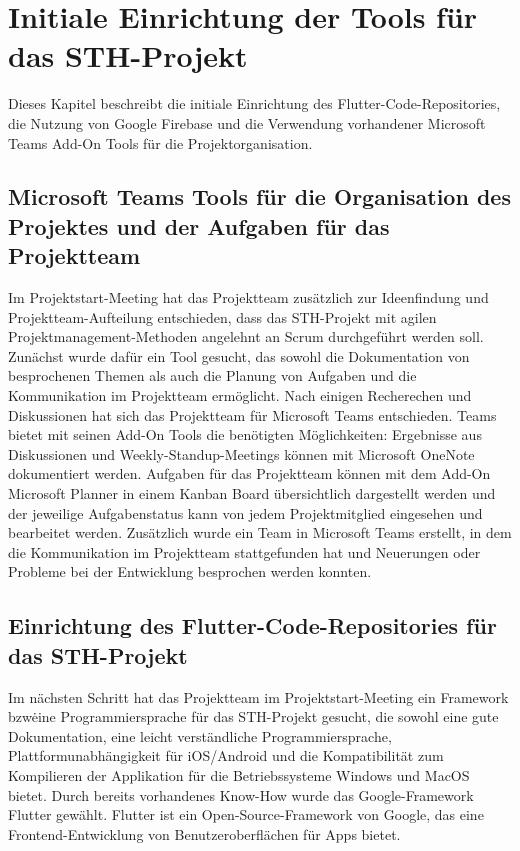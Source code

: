 \chapter{Initiale Einrichtung der Tools für das STH-Projekt}
Dieses Kapitel beschreibt die initiale Einrichtung des Flutter-Code-Repositories, die Nutzung von Google Firebase und die Verwendung vorhandener Microsoft Teams Add-On Tools für die Projektorganisation.

\section*{Microsoft Teams Tools für die Organisation des Projektes und der Aufgaben für das Projektteam}
Im Projektstart-Meeting hat das Projektteam zusätzlich zur Ideenfindung und Projektteam-Aufteilung entschieden, dass das STH-Projekt mit agilen Projektmanagement-Methoden angelehnt an Scrum durchgeführt werden soll.
Zunächst wurde dafür ein Tool gesucht, das sowohl die Dokumentation von besprochenen Themen als auch die Planung von Aufgaben und die Kommunikation im Projektteam ermöglicht.
Nach einigen Recherechen und Diskussionen hat sich das Projektteam für Microsoft Teams entschieden.
Teams bietet mit seinen Add-On Tools die benötigten Möglichkeiten:\newline
Ergebnisse aus Diskussionen und Weekly-Standup-Meetings können mit Microsoft OneNote dokumentiert werden.
Aufgaben für das Projektteam können mit dem Add-On Microsoft Planner in einem Kanban Board übersichtlich dargestellt werden und der jeweilige Aufgabenstatus kann von jedem Projektmitglied eingesehen und bearbeitet werden.
Zusätzlich wurde ein Team in Microsoft Teams erstellt, in dem die Kommunikation im Projektteam stattgefunden hat und Neuerungen oder Probleme bei der Entwicklung besprochen werden konnten. 
\section*{Einrichtung des Flutter-Code-Repositories für das STH-Projekt}
Im nächsten Schritt hat das Projektteam im Projektstart-Meeting ein Framework bzw\. eine Programmiersprache für das STH-Projekt gesucht, die sowohl eine gute Dokumentation, eine leicht verständliche Programmiersprache, Plattformunabhängigkeit für iOS/Android und die Kompatibilität zum Kompilieren der Applikation für die Betriebssysteme Windows und MacOS bietet.
Durch bereits vorhandenes Know-How wurde das Google-Framework Flutter gewählt.\newline
Flutter ist ein Open-Source-Framework von Google, das eine Frontend-Entwicklung von Benutzeroberflächen für Apps bietet.

